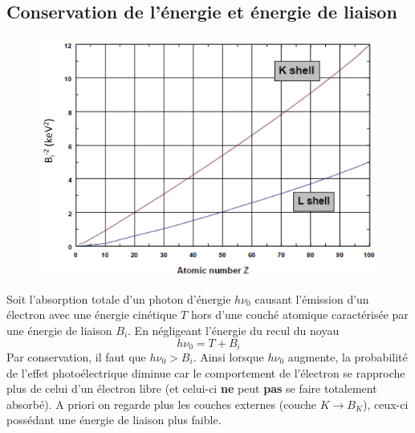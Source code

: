\subsection{Conservation de l'énergie et énergie de liaison} %
	\begin{figure}
	\vspace{-5mm}
	\includegraphics[scale=0.5]{ch4/image8}
	\end{figure}
Soit l'absorption totale d'un photon d'énergie $h\nu_0$ causant l'émission d'un électron avec une
énergie cinétique $T$ hors d'une couché atomique caractérisée par une énergie de liaison $B_i$. En
négligeant l'énergie du recul du noyau
\begin{equation}
h\nu_0=T+B_i
\end{equation}
Par conservation, il faut que $h\nu_0>B_i$. Ainsi lorsque $h\nu_0$ augmente, la probabilité de l'effet
photoélectrique diminue car le comportement de l'électron se rapproche plus de celui d'un électron
libre (et celui-ci \textbf{ne} peut \textbf{pas} se faire totalement absorbé). A priori on regarde 
plus les couches externes (couche $K\to B_K$), ceux-ci possédant une énergie de liaison plus faible.

\newpage
